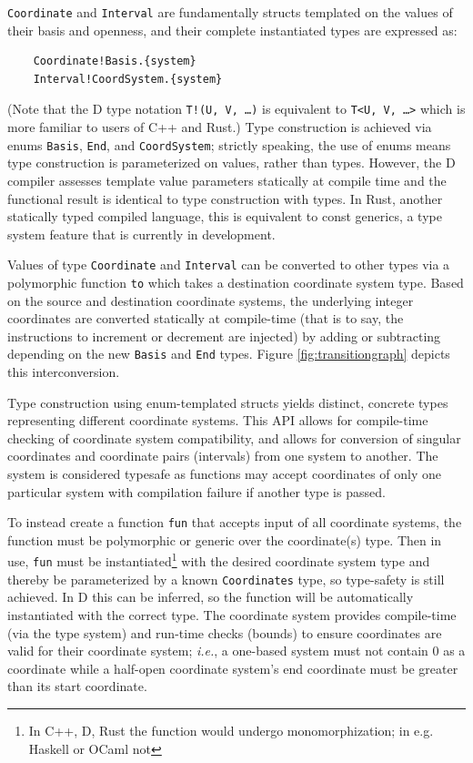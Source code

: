 \documentclass[12pt]{article}
\begin{document}
\texttt{Coordinate} and \texttt{Interval} are fundamentally structs templated on the values of their basis and openness, and their complete instantiated types are expressed as:

\begin{verbatim}
    Coordinate!Basis.{system}
    Interval!CoordSystem.{system}
\end{verbatim}

(Note that the D type notation \texttt{T!(U, V, \ldots)} is equivalent to \texttt{T<U, V, \ldots>} which is more familiar to users of C++ and Rust.) Type construction is achieved via enums \texttt{Basis}, \texttt{End}, and \texttt{CoordSystem}; strictly speaking, the use of enums means type construction is parameterized on values, rather than types. However, the D compiler assesses template value parameters statically at compile time and the functional result is identical to type construction with types. In Rust, another statically typed compiled language, this is equivalent to const generics, a type system feature that is currently in development.

Values of type \texttt{Coordinate} and \texttt{Interval} can be converted to other types via a polymorphic function \texttt{to} which takes a destination coordinate system type. Based on the source and destination coordinate systems, the underlying integer coordinates are converted statically at compile-time (that is to say, the instructions to increment or decrement are injected) by adding or subtracting depending on the new \texttt{Basis} and \texttt{End} types. Figure \ref{fig:transitiongraph} depicts this interconversion.

Type construction using enum-templated structs yields distinct, concrete types representing different coordinate systems. This API allows for compile-time checking of coordinate system compatibility, and allows for conversion of singular coordinates and coordinate pairs (intervals) from one system to another. The system is considered typesafe as functions may accept coordinates of only one particular system with compilation failure if another type is passed. 

To instead create a function \texttt{fun} that accepts input of all coordinate systems, the function must be polymorphic or generic over the coordinate(s) type. Then in use, \texttt{fun} must be instantiated\footnote{In C++, D, Rust the function would undergo monomorphization; in e.g. Haskell or OCaml not} with the desired coordinate system type and thereby be parameterized by a known \texttt{Coordinates} type, so type-safety is still achieved. In D this can be inferred, so the function will be automatically instantiated with the correct type. The coordinate system provides compile-time (via the type system) and run-time checks (bounds) to ensure coordinates are valid for their coordinate system; \textit{i.e.}, a one-based system must not contain 0 as a coordinate while a half-open coordinate system’s end coordinate must be greater than its start coordinate.
\end{document}
